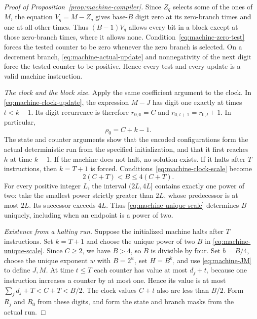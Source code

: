 \begin{proof}[Proof of Proposition~\ref{prop:machine-compiler}]
Since $Z_q$ selects some of the ones of $M$, the equation
$V_q=M-Z_q$ gives base-$B$ digit zero at its zero-branch times and
one at all other times. Thus $(B-1)V_q$ allows every bit in a block
except at those zero-branch times, where it allows none.
Condition~\eqref{eq:machine-zero-test} forces the tested counter
to be zero whenever the zero branch is selected. On a decrement
branch, \eqref{eq:machine-actual-update} and nonnegativity of the
next digit force the tested counter to be positive. Hence every
test and every update is a valid machine instruction.

\emph{The clock and the block size.}
Apply the same coefficient argument to the clock. In
\eqref{eq:machine-clock-update}, the expression $M-J$ has digit
one exactly at times $t<k-1$. Its digit recurrence is therefore
$r_{0,0}=C$ and $r_{0,t+1}=r_{0,t}+1$. In particular,
\begin{equation}\label{eq:machine-clock-value}
 \rho_0=C+k-1.
\end{equation}
The state and counter arguments show that the encoded configurations
form the actual deterministic run from the specified initialization,
and that it first reaches $h$ at time $k-1$. If the machine does not
halt, no solution exists. If it halts after $T$ instructions, then
$k=T+1$ is forced. Conditions~\eqref{eq:machine-clock-scale} become
\begin{equation}\label{eq:machine-unique-scale}
 2(C+T)<B\leq4(C+T).
\end{equation}
For every positive integer $L$, the interval $(2L,4L]$ contains
exactly one power of two: take the smallest power strictly greater
than $2L$, whose predecessor is at most $2L$. Its successor exceeds
$4L$. Thus \eqref{eq:machine-unique-scale} determines $B$ uniquely,
including when an endpoint is a power of two.

\emph{Existence from a halting run.}
Suppose the initialized machine halts after $T$ instructions. Set
$k=T+1$ and choose the unique power of two $B$ in
\eqref{eq:machine-unique-scale}. Since $C\geq2$, we have $B>4$,
so $B$ is divisible by four. Set $b=B/4$, choose the unique exponent
$w$ with $B=2^w$, set $H=B^k$, and use
\eqref{eq:machine-JM} to define $J,M$.
At time $t\leq T$ each counter has value at most $d_j+t$, because
one instruction increases a counter by at most one. Hence its value
is at most $\sum_jd_j+T<C+T<B/2$. The clock values $C+t$ also
are less than $B/2$. Form $R_j$ and $R_0$ from these digits, and
form the state and branch masks from the actual run.


\end{proof}
